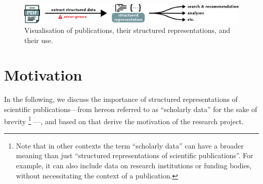 

\begin{figure}[h]
  \centering
  \includegraphics[width=\linewidth]{figures/introduction/structured_representations_of_publucations}
  \caption[test]{Visualisation of publications, their structured representations, and their use.}
  \label{fig:introduction-structreps}
\end{figure}

\section{Motivation}


In the following, we discuss the importance of structured representations of scientific publications---from hereon referred to as ``scholarly data'' for the sake of brevity%
\footnote{Note that in other contexts the term ``scholarly data'' can have a broader meaning than just ``structured representations of scientific publications''. For example, it can also include data on research institutions or funding bodies, without necessitating the context of a publication.}%
---, and based on that derive the motivation of the research project.



